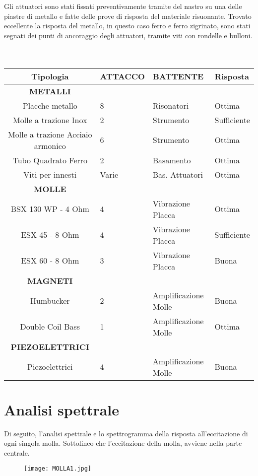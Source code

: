 Gli attuatori sono stati fissati preventivamente tramite del nastro su una delle piastre di metallo e fatte delle prove di risposta del materiale risuonante. Trovato eccellente la risposta del metallo, in questo caso ferro e ferro zigrinato, sono stati segnati dei punti di ancoraggio degli attuatori, tramite viti con rondelle e bulloni. \\ \\
\\
\begin{tabular}{cp{2cm}p{2cm}p{2cm}} \textbf{Tipologia}&\textbf{ATTACCO}&\textbf{BATTENTE}&\textbf{Risposta}\\ 
\hline \textbf{METALLI}\\
\hline Placche metallo&8&Risonatori&Ottima\\
\hline Molle a trazione Inox&2&Strumento&Sufficiente\\
\hline Molle a trazione Acciaio armonico&6&Strumento&Ottima\\
\hline Tubo Quadrato Ferro&2&Basamento&Ottima\\
\hline Viti per innesti&Varie&Bas. Attuatori&Ottima\\
\hline \textbf{MOLLE}\\
\hline BSX 130 WP - 4 Ohm&4&Vibrazione Placca&Ottima\\ 
\hline ESX 45 - 8 Ohm&4&Vibrazione Placca&Sufficiente\\
\hline ESX 60 - 8 Ohm&3&Vibrazione Placca&Buona\\
\hline \textbf{MAGNETI}\\
\hline Humbucker&2&Amplificazione Molle&Buona\\
\hline Double Coil Bass&1&Amplificazione Molle&Ottima\\
\hline \textbf{PIEZOELETTRICI} \\
\hline Piezoelettrici&4&Amplificazione Molle&Buona\\
\hline 
\end{tabular}

\section{Analisi spettrale}
Di seguito, l'analisi spettrale e lo spettrogramma della risposta all'eccitazione di ogni singola molla. Sottolineo che l'eccitazione della molla, avviene nella parte centrale. \\

 \begin{figure}[htbp]
        \centering
        \texttt{[image: MOLLA1.jpg]}
\end{figure}

